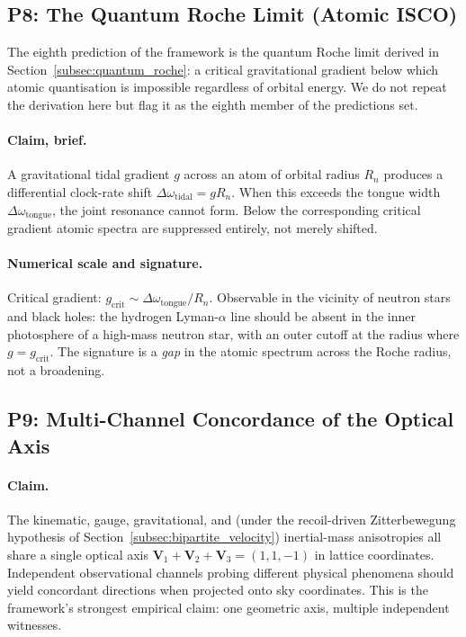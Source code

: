 \subsection{P8: The Quantum Roche Limit (Atomic ISCO)}
\label{subsec:p8_quantum_roche}

The eighth prediction of the framework is the quantum Roche limit
derived in Section~\ref{subsec:quantum_roche}: a critical
gravitational gradient below which atomic quantisation is impossible
regardless of orbital energy. We do not repeat the derivation here
but flag it as the eighth member of the predictions set.

\paragraph{Claim, brief.}
A gravitational tidal gradient $g$ across an atom of orbital radius
$R_n$ produces a differential clock-rate shift
$\Delta\omega_\text{tidal} = g R_n$. When this exceeds the tongue
width $\Delta\omega_\text{tongue}$, the joint resonance cannot
form. Below the corresponding critical gradient atomic spectra are
suppressed entirely, not merely shifted.

\paragraph{Numerical scale and signature.}
Critical gradient: $g_\text{crit} \sim \Delta\omega_\text{tongue}/R_n$.
Observable in the vicinity of neutron stars and black holes: the
hydrogen Lyman-$\alpha$ line should be absent in the inner
photosphere of a high-mass neutron star, with an outer cutoff at
the radius where $g = g_\text{crit}$. The signature is a
\emph{gap} in the atomic spectrum across the Roche radius, not a
broadening.

\subsection{P9: Multi-Channel Concordance of the Optical Axis}
\label{subsec:p9_concordance}

\paragraph{Claim.}
The kinematic, gauge, gravitational, and (under the recoil-driven
Zitterbewegung hypothesis of Section~\ref{subsec:bipartite_velocity})
inertial-mass anisotropies all share a single optical axis
$\mathbf{V}_1 + \mathbf{V}_2 + \mathbf{V}_3 = (1, 1, -1)$ in lattice
coordinates.  Independent observational channels probing different
physical phenomena should yield concordant directions when projected
onto sky coordinates.  This is the framework's strongest empirical
claim: one geometric axis, multiple independent witnesses.

